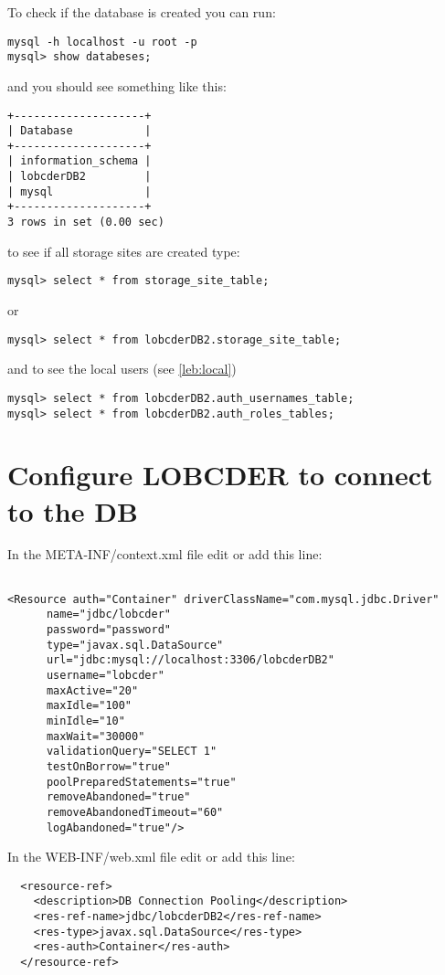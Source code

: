 \documentclass[a4paper,10pt]{article}
\begin{document}
To check if the database is created you can run:
\begin{lstlisting}
mysql -h localhost -u root -p
mysql> show databeses;
\end{lstlisting}

and you should see something like this: 

\begin{lstlisting}
+--------------------+
| Database           |
+--------------------+
| information_schema |
| lobcderDB2         |
| mysql              |
+--------------------+
3 rows in set (0.00 sec)
\end{lstlisting}


to see if all storage sites are created type:

\begin{lstlisting}
mysql> select * from storage_site_table;
\end{lstlisting}
or 
\begin{lstlisting}
mysql> select * from lobcderDB2.storage_site_table;
\end{lstlisting}

and to see the local users (see \ref{leb:local})

\begin{lstlisting}
mysql> select * from lobcderDB2.auth_usernames_table;
mysql> select * from lobcderDB2.auth_roles_tables;
\end{lstlisting}


\section{Configure LOBCDER to connect to the DB}
In the META-INF/context.xml file edit or add this line:

\begin{lstlisting}

<Resource auth="Container" driverClassName="com.mysql.jdbc.Driver"
      name="jdbc/lobcder" 
      password="password"
      type="javax.sql.DataSource" 
      url="jdbc:mysql://localhost:3306/lobcderDB2" 
      username="lobcder"
      maxActive="20"
      maxIdle="100"
      minIdle="10"
      maxWait="30000"
      validationQuery="SELECT 1"
      testOnBorrow="true"
      poolPreparedStatements="true"
      removeAbandoned="true"
      removeAbandonedTimeout="60"
      logAbandoned="true"/>
\end{lstlisting}

In the WEB-INF/web.xml file edit or add this line:
\begin{lstlisting}
  <resource-ref>
    <description>DB Connection Pooling</description>
    <res-ref-name>jdbc/lobcderDB2</res-ref-name>
    <res-type>javax.sql.DataSource</res-type>
    <res-auth>Container</res-auth>
  </resource-ref>
\end{lstlisting}
\end{document}
